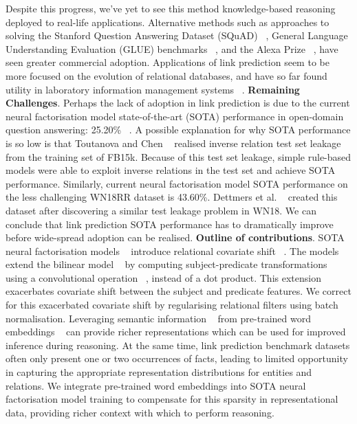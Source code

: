 Despite this progress, we've yet to see this method knowledge-based reasoning deployed to real-life applications. Alternative methods such as approaches to solving the Stanford Question Answering Dataset (SQuAD) ~\citep{rajpurkar2016squad}, General Language Understanding Evaluation (GLUE) benchmarks ~\citep{liu2019roberta}, and the Alexa Prize ~\citep{ram2018conversational}, have seen greater commercial adoption. Applications of link prediction seem to be more focused on the evolution of relational databases, and have so far found utility in laboratory information management systems ~\citep{HARROW20192068}. \newline
\textbf{Remaining Challenges}. Perhaps the lack of adoption in link prediction is due to the current neural factorisation model state-of-the-art (SOTA) performance in open-domain question answering: 25.20\% ~\citep{balazevic2019hypernetwork}. A possible explanation for why SOTA performance is so low is that Toutanova and Chen ~\citep{toutanova2015observed} realised inverse relation test set leakage from the training set of FB15k. Because of this test set leakage, simple rule-based models were able to exploit inverse relations in the test set and achieve SOTA performance. Similarly, current neural factorisation model SOTA performance on the less challenging WN18RR dataset is 43.60\%. Dettmers et al. ~\citep{dettmers2018convolutional} created this dataset after discovering a similar test leakage problem in WN18. We can conclude that link prediction SOTA performance has to dramatically improve before wide-spread adoption can be realised. \newline
\textbf{Outline of contributions}. SOTA neural factorisation models ~\citep{balazevic2019hypernetwork, dettmers2018convolutional} introduce relational covariate shift ~\citep{ioffe2015batch}. The models extend the bilinear model ~\citep{jenatton2012latent} by computing subject-predicate transformations using a convolutional operation ~\citep{zeiler2014visualizing}, instead of a dot product. This extension exacerbates covariate shift between the subject and predicate features. We correct for this exacerbated covariate shift by regularising relational filters using batch normalisation. \newline 
Leveraging semantic information ~\citep{NIPS2013_5028} from pre-trained word embeddings ~\citep{mikolov2013distributed} can provide richer representations which can be used for improved inference during reasoning. At the same time, link prediction benchmark datasets often only present one or two occurrences of facts, leading to limited opportunity in capturing the appropriate representation distributions for entities and relations. We integrate pre-trained word embeddings into SOTA neural factorisation model training to compensate for this sparsity in representational data, providing richer context with which to perform reasoning. \newline
